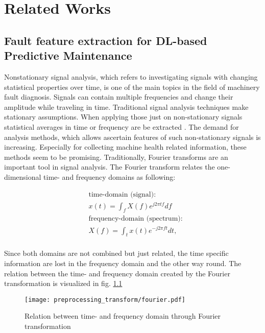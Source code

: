 
\chapter{Related Works}\label{chapter:related_works}

\section{Fault feature extraction for DL-based Predictive Maintenance}
Nonstationary signal analysis, which refers to investigating signals with changing statistical properties over time, is one of the main topics in the field of machinery fault diagnosis. Signals can contain multiple frequencies and change their amplitude while traveling in time. Traditional signal analysis techniques make stationary assumptions. When applying those just on non-stationary signals statistical averages in time or frequency are be extracted \cite{FENG2013}. The demand for analysis methods, which allows ascertain features of such non-stationary signals is increasing. Especially for collecting machine health related information, these methods seem to be promising. Traditionally, Fourier transforms are an important tool in signal analysis. The Fourier transform relates the one-dimensional time- and frequency domains as following:

\begin{equation}
    \begin{aligned}
        & \mbox{time-domain (signal):} \\
        & x(t) = \int_{f} X(f) e^{j 2 \pi t f} df \\
        & \mbox{frequency-domain (spectrum):} \\
        & X(f) = \int_{t} x(t) e^{- j 2 \pi f t} dt, \\
    \end{aligned}
\end{equation}

Since both domains are not combined but just related, the time specific information are lost in the frequency domain and the other way round. The relation between the time- and frequency domain created by the Fourier transformation is visualized in fig. \ref{fig:fourier} 
\begin{figure}[H]
  \centering
  \texttt{[image: preprocessing\_transform/fourier.pdf]}
  \caption{Relation between time- and frequency domain through Fourier transformation}
  \label{fig:fourier}
\end{figure}

